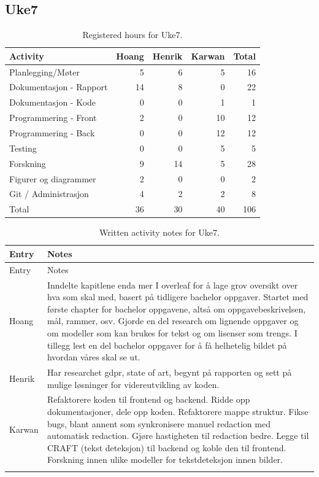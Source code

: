 \subsection{Uke7}

\begin{table}[H]
\centering
\small
\caption{Registered hours for Uke7.}
\label{tab:project-hours-uke7}
\begin{tabular}{lrrrr}
\toprule
Activity & Hoang & Henrik & Karwan & Total \\
\midrule
Planlegging/Møter & 5 & 6 & 5 & 16 \\
Dokumentasjon - Rapport & 14 & 8 & 0 & 22 \\
Dokumentasjon - Kode & 0 & 0 & 1 & 1 \\
Programmering - Front & 2 & 0 & 10 & 12 \\
Programmering - Back & 0 & 0 & 12 & 12 \\
Testing & 0 & 0 & 5 & 5 \\
Forskning & 9 & 14 & 5 & 28 \\
Figurer og diagrammer & 2 & 0 & 0 & 2 \\
Git / Administrasjon & 4 & 2 & 2 & 8 \\
\midrule
Total & 36 & 30 & 40 & 106 \\
\bottomrule
\end{tabular}
\end{table}

\begin{longtable}{p{}p{}}
\caption{Written activity notes for Uke7.}\\
\toprule
Entry & Notes \\
\midrule
\endfirsthead
\toprule
Entry & Notes \\
\midrule
\endhead
Hoang & Inndelte kapitlene enda mer I overleaf for å lage grov oversikt over hva som skal med, basert på tidligere bachelor oppgaver. Startet med første chapter for bachelor oppgavene, altså om oppgavebeskrivelsen, mål, rammer, osv. Gjorde en del research om lignende oppgaver og om modeller som kan brukes for tekst og om lisenser som trengs. I tillegg lest en del bachelor oppgaver for å få helhetelig bildet på hvordan våres skal se ut. \\
\addlinespace
Henrik & Har researchet gdpr, state of art, begynt på rapporten og sett på mulige løsninger for videreutvikling av koden. \\
\addlinespace
Karwan & Refaktorere koden til frontend og backend. Ridde opp dokumentasjoner, dele opp koden. Refaktorere mappe struktur. Fikse bugs, blant annent som synkronisere manuel redaction med automatisk redaction. Gjøre hastigheten til redaction bedre. Legge til CRAFT (tekst deteksjon) til backend og koble den til frontend. Forskning innen ulike modeller for tekstdeteksjon innen bilder. \\
\addlinespace
\bottomrule
\end{longtable}

